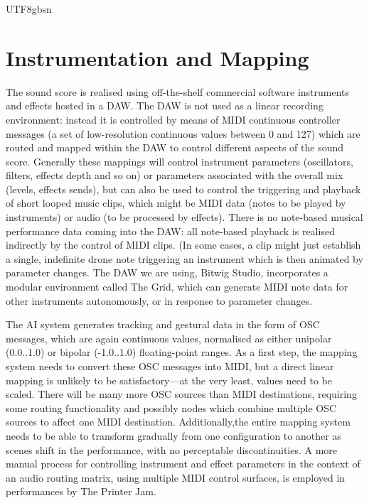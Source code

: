 \documentclass[manuscript,review,anonymous,natbib=false]{acmart}
\begin{document}
\begin{CJK*}{UTF8}{gbsn}
  \section{Instrumentation and Mapping}

  The sound score is realised using off-the-shelf commercial software instruments and effects hosted in a DAW. The DAW is not used as a linear recording environment: instead it is controlled by means of MIDI continuous controller messages (a set of low-resolution continuous values between 0 and 127) which are routed and mapped within the DAW to control different aspects of the sound score. Generally these mappings will control instrument parameters (oscillators, filters, effects depth and so on) or parameters associated with the overall mix (levels, effects sends), but can also be used to control the triggering and playback of short looped music clips, which might be MIDI data (notes to be played by instruments) or audio (to be processed by effects). There is no note-based musical performance data coming into the DAW: all note-based playback is realised indirectly by the control of MIDI clips. (In some cases, a clip might just establish a single, indefinite drone note triggering an instrument which is then animated by parameter changes. The DAW we are using, Bitwig Studio\cite{noauthor_bitwig_nodate}, incorporates a modular environment called The Grid\cite{noauthor_grid_nodate}, which can generate MIDI note data for other instruments autonomously, or in response to parameter changes.

  The AI system generates tracking and gestural data in the form of OSC messages, which are again continuous values, normalised as either unipolar (0.0..1.0) or bipolar (-1.0..1.0) floating-point ranges. As a first step, the mapping system needs to convert these OSC messages into MIDI, but a direct linear mapping is unlikely to be satisfactory---at the very least, values need to be scaled. There will be many more OSC sources than MIDI destinations, requiring some routing functionality and possibly nodes which combine multiple OSC sources to affect one MIDI destination. Additionally,the entire mapping system needs to be able to transform gradually from one configuration to another as scenes shift in the performance, with no perceptable discontinuities. A more manual process for controlling instrument and effect parameters in the context of an audio routing matrix, using multiple MIDI control surfaces, is employed in performances by The Printer Jam\cite{noauthor_printer_nodate}.


\end{CJK*}
\end{document}
